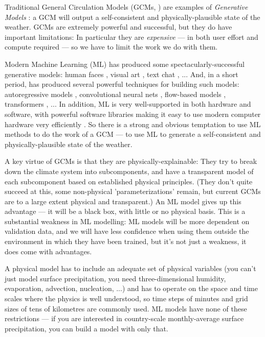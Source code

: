 \documentclass[gmd]{copernicus}
\begin{document}
Traditional General Circulation Models (GCMs, \citet{phillips1956general}) are examples of {\em Generative Models} \citep{Generative}: a GCM will output a self-consistent and physically-plausible state of the weather. GCMs are extremely powerful and successful, but they do have important limitations: In particular they are {\em expensive} --- in both user effort and compute required --- so we have to limit the work we do with them.

Modern Machine Learning (ML) has produced some spectacularly-successful generative models: human faces \citep{StyleGAN2}, visual art \citep{Stable_Diffusion}, text chat \citep{ChatGPT}, ... And, in a short period, has produced several powerful techniques for building such models: autoregressive models \citep{oord2016pixel}, convolutional neural nets \citep{LeNet}, flow-based models \citep{dinh2017density}, transformers \citep{vaswani2017attention}, ... In addition, ML is very well-supported in both hardware and software, with powerful software libraries making it easy to use modern computer hardware very efficiently \citep{tensorflow2015-whitepaper}. So there is a strong and obvious temptation to use ML methods to do the work of a GCM --- to use ML to generate a self-consistent and physically-plausible state of the weather.

A key virtue of GCMs is that they are physically-explainable: They try to break down the climate system into subcomponents, and have a transparent model of each subcomponent based on established physical principles. (They don't quite succeed at this, some non-physical 'parameterizations' remain, but current GCMs are to a large extent physical and transparent.) An ML model gives up this advantage --- it will be a black box, with little or no physical basis. This is a substantial weakness in ML modelling: ML models will be more dependent on validation data, and we will have less confidence when using them outside the environment in which they have been trained, but it's not just a weakness, it does come with advantages.

A physical model has to include an adequate set of physical variables (you can't just model surface precipitation, you need three-dimensional humidity, evaporation, advection, nucleation, ...) and has to operate on the space and time scales where the physics is well understood, so time steps of minutes and grid sizes of tens of kilometres are commonly used. ML models have none of these restrictions --- if you are interested in country-scale monthly-average surface precipitation, you can build a model with only that.
\end{document}

